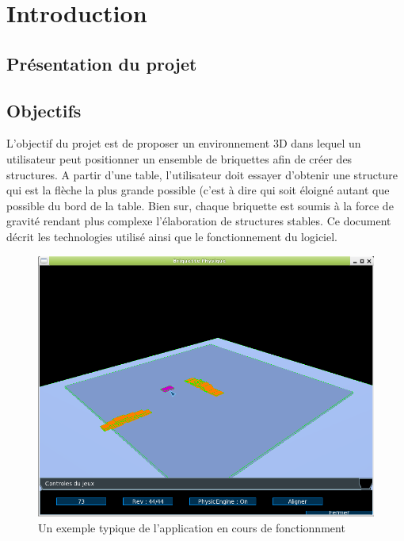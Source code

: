 \documentclass[frenchb,twoside]{EPURapport}
\begin{document}
\chapter{Introduction}

\section{Présentation du projet}
\section{Objectifs}
    L'objectif du projet est de proposer un environnement 3D dans lequel un
    utilisateur peut positionner un ensemble de briquettes afin de créer des
    structures. A partir d'une table, l'utilisateur doit essayer d'obtenir une
    structure qui est la flèche la plus grande possible (c'est à dire qui soit
    éloigné autant que possible du bord de la table.
    Bien sur, chaque briquette est soumis à la force de gravité rendant plus
    complexe l'élaboration de structures stables.
    Ce document décrit les technologies utilisé ainsi que le fonctionnement du
    logiciel.
    \begin{figure}[h]
		\centering
        \includegraphics[scale=0.75]{images/jeux.png}
        \caption{\label{fig:jeux}Un exemple typique de l'application en cours de fonctionnment}
    \end{figure}
\end{document}
